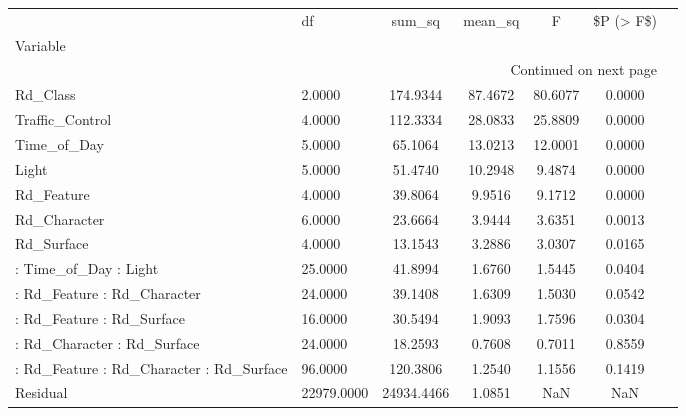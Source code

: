 \begin{longtable}{p{6cm}lccccc}
\toprule
{} &         df &     sum\_sq &  mean\_sq &       F &  \$P (> F\$) \\
Variable                                  &            &            &          &         &            \\
\midrule
\endhead
\midrule
\multicolumn{6}{r}{{Continued on next page}} \\
\midrule
\endfoot

\bottomrule
\endlastfoot
Rd\_Class                                  &     2.0000 &   174.9344 &  87.4672 & 80.6077 &     0.0000 \\
Traffic\_Control                           &     4.0000 &   112.3334 &  28.0833 & 25.8809 &     0.0000 \\
Time\_of\_Day                               &     5.0000 &    65.1064 &  13.0213 & 12.0001 &     0.0000 \\
Light                                     &     5.0000 &    51.4740 &  10.2948 &  9.4874 &     0.0000 \\
Rd\_Feature                                &     4.0000 &    39.8064 &   9.9516 &  9.1712 &     0.0000 \\
Rd\_Character                              &     6.0000 &    23.6664 &   3.9444 &  3.6351 &     0.0013 \\
Rd\_Surface                                &     4.0000 &    13.1543 &   3.2886 &  3.0307 &     0.0165 \\
 : Time\_of\_Day : Light                    &    25.0000 &    41.8994 &   1.6760 &  1.5445 &     0.0404 \\
 : Rd\_Feature : Rd\_Character              &    24.0000 &    39.1408 &   1.6309 &  1.5030 &     0.0542 \\
 : Rd\_Feature : Rd\_Surface                &    16.0000 &    30.5494 &   1.9093 &  1.7596 &     0.0304 \\
 : Rd\_Character : Rd\_Surface              &    24.0000 &    18.2593 &   0.7608 &  0.7011 &     0.8559 \\
 : Rd\_Feature : Rd\_Character : Rd\_Surface &    96.0000 &   120.3806 &   1.2540 &  1.1556 &     0.1419 \\
Residual                                  & 22979.0000 & 24934.4466 &   1.0851 &     NaN &        NaN \\
\end{longtable}
